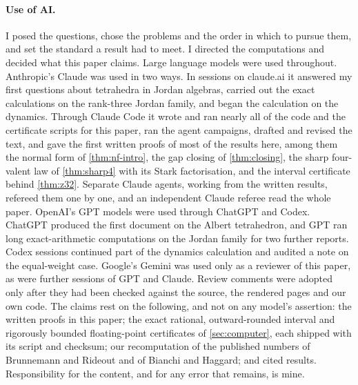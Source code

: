\paragraph{Use of AI.} I posed the questions, chose the problems and the order in which to
pursue them, and set the standard a result had to meet. I directed the computations and
decided what this paper claims. Large language models were used throughout. Anthropic's
Claude was used in two ways. In sessions on claude.ai it answered my first questions about
tetrahedra in Jordan algebras, carried out the exact calculations on the rank-three Jordan
family, and began the calculation on the dynamics. Through Claude Code it wrote and ran
nearly all of the code and the certificate scripts for this paper, ran the agent campaigns,
drafted and revised the text, and gave the first written proofs of most of the results
here, among them the normal form of \cref{thm:nf-intro}, the gap closing of
\cref{thm:closing}, the sharp four-valent law of \cref{thm:sharp4} with its Stark
factorisation, and the interval certificate behind \cref{thm:z32}. Separate Claude agents,
working from the written results, refereed them one by one, and an independent Claude
referee read the whole paper. OpenAI's GPT models were used through ChatGPT and Codex.
ChatGPT produced the first document on the Albert tetrahedron, and GPT ran long
exact-arithmetic computations on the Jordan family for two further reports. Codex sessions
continued part of the dynamics calculation and audited a note on the equal-weight case.
Google's Gemini was used only as a reviewer of this paper, as were further sessions of GPT
and Claude. Review comments were adopted only after they had been checked against the
source, the rendered pages and our own code. The claims rest on the following, and not on
any model's assertion: the written proofs in this paper; the exact rational, outward-rounded
interval and rigorously bounded floating-point certificates of \cref{sec:computer}, each
shipped with its script and checksum; our recomputation of the published numbers of
Brunnemann and Rideout and of Bianchi and Haggard; and cited results. Responsibility for
the content, and for any error that remains, is mine.
